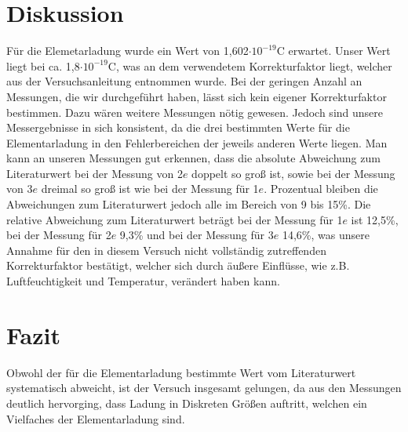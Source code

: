 \documentclass[12pt]{scrartcl}
\begin{document}
\section{Diskussion}
Für die Elemetarladung wurde ein Wert von 1,602$\cdot 10^{-19}$C erwartet. Unser Wert liegt bei ca. 1,8$\cdot 10^{-19}$C, was an dem verwendetem Korrekturfaktor liegt, welcher aus der Versuchsanleitung entnommen wurde. Bei der geringen Anzahl an Messungen, die wir durchgeführt haben, lässt sich kein eigener Korrekturfaktor bestimmen. Dazu wären weitere Messungen nötig gewesen. Jedoch sind unsere Messergebnisse in sich konsistent, da die drei bestimmten Werte für die Elementarladung in den Fehlerbereichen der jeweils anderen Werte liegen. Man kann an unseren Messungen gut erkennen, dass die absolute Abweichung zum Literaturwert bei der Messung von 2$e$ doppelt so groß ist, sowie bei der Messung von 3$e$ dreimal so groß ist wie bei der Messung für 1$e$. Prozentual bleiben die Abweichungen zum Literaturwert jedoch alle im Bereich von 9 bis 15\%. Die relative Abweichung zum Literaturwert beträgt bei der Messung für 1$e$ ist 12,5\%, bei der Messung für 2$e$ 9,3\% und bei der Messung für 3$e$ 14,6\%, was unsere Annahme für den in diesem Versuch nicht vollständig zutreffenden Korrekturfaktor bestätigt, welcher sich durch äußere Einflüsse, wie z.B. Luftfeuchtigkeit und Temperatur, verändert haben kann.   

\section{Fazit}
Obwohl der für die Elementarladung bestimmte Wert vom Literaturwert systematisch abweicht, ist der Versuch insgesamt gelungen, da aus den Messungen deutlich hervorging, dass Ladung in Diskreten Größen auftritt, welchen ein Vielfaches der Elementarladung sind.
\end{document}
